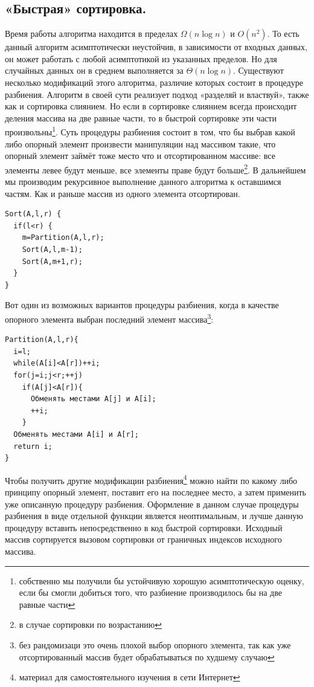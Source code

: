 \documentclass[12pt]{article}
\begin{document}
\subsection{«Быстрая» сортировка.} Время работы алгоритма находится в пределах $ \Omega{}(n\log{}n) $ и $ O(n^{2}) $.
То есть данный алгоритм асимптотически неустойчив, в зависимости от входных данных, он может работать с любой
асимптотикой из указанных пределов. Но для случайных данных он в среднем выполняется за $ \Theta(n\log{}n) $.
Существуют несколько модификаций этого алгоритма, различие которых состоит в процедуре разбиения. Алгоритм в своей сути
реализует подход «разделяй и властвуй», также как и сортировка слиянием. Но если в сортировке слиянием всегда происходит
деления массива на две равные части, то в быстрой сортировке эти части произвольны\footnote{собственно мы получили бы
устойчивую хорошую асимптотическую оценку, если бы смогли добиться того, что  разбиение производилось бы на две равные
части}. Суть процедуры разбиения состоит в том, что бы выбрав какой либо опорный элемент произвести манипуляции над
массивом такие, что опорный элемент займёт тоже место что и отсортированном массиве: все элементы левее будут меньше,
все элементы праве будут больше\footnote{в случае сортировки по возрастанию}. В дальнейшем мы производим рекурсивное
выполнение данного алгоритма к оставшимся частям. Как и раньше массив из одного элемента отсортирован.
\begin{verbatim}
Sort(A,l,r) {
  if(l<r) {
    m=Partition(A,l,r);
    Sort(A,l,m-1);
    Sort(A,m+1,r);
  }
}
\end{verbatim}

Вот один из возможных вариантов процедуры разбиения, когда в качестве опорного элемента выбран последний элемент
массива\footnote{без рандомизаци это очень плохой выбор опорного элемента, так как уже отсортированный массив будет
обрабатываться по худшему случаю}:
\begin{verbatim}
Partition(A,l,r){
  i=l;
  while(A[i]<A[r])++i;
  for(j=i;j<r;++j)
    if(A[j]<A[r]){
      Обменять местами A[j] и A[i];
      ++i;
    }
  Обменять местами A[i] и A[r];
  return i;
}
\end{verbatim}
Чтобы получить другие модификации разбиения\footnote{материал для самостоятельного изучения в сети Интернет} можно
найти по какому либо принципу опорный элемент, поставит его на последнее место, а затем применить уже описанную
процедуру разбиения. Оформление в данном случае процедуры разбиения в виде отдельной функции является неоптимальным, и
лучше данную процедуру вставить непосредственно в код быстрой сортировки. Исходный массив сортируется вызовом сортировки
от граничных индексов исходного массива.
\end{document}
